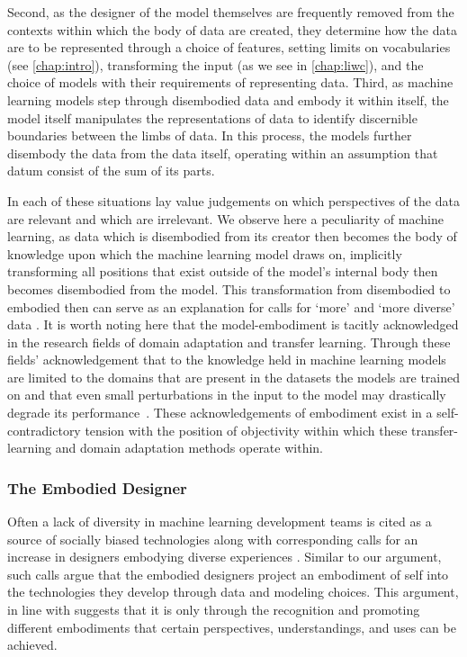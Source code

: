 Second, as the designer of the model themselves are frequently removed from the contexts within which the body of data are created, they determine how the data are to be represented through a choice of features, setting limits on vocabularies (see \autoref{chap:intro}), transforming the input (as we see in \autoref{chap:liwc}), and the choice of models with their requirements of representing data.
Third, as machine learning models step through disembodied data and embody it within itself, the model itself manipulates the representations of data to identify discernible boundaries between the limbs of data. In this process, the models further disembody the data from the data itself, operating within an assumption that datum consist of the sum of its parts.

In each of these situations lay value judgements on which perspectives of the data are relevant and which are irrelevant. We observe here a peculiarity of machine learning, as data which is disembodied from its creator then becomes the body of knowledge upon which the machine learning model draws on, implicitly transforming all positions that exist outside of the model's internal body then becomes disembodied from the model. This transformation from disembodied to embodied then can serve as an explanation for calls for `more' and `more diverse' data \cite{Holstein:2019}.
It is worth noting here that the model-embodiment is tacitly acknowledged in the research fields of domain adaptation \cite{Daume:2007} and transfer learning. Through these fields' acknowledgement that to the knowledge held in machine learning models are limited to the domains that are present in the datasets the models are trained on and that even small perturbations in the input to the model may drastically degrade its performance~\cite{Szegedy:2014,Daume:2007}. These acknowledgements of embodiment exist in a self-contradictory tension with the position of objectivity within which these transfer-learning and domain adaptation methods operate within.

\subsubsection{The Embodied Designer}
Often a lack of diversity in machine learning development teams is cited as a source of socially biased technologies along with corresponding calls for an increase in designers embodying diverse experiences \cite{West:2019}. Similar to our argument, such calls argue that the embodied designers project an embodiment of self into the technologies they develop through data and modeling choices. This argument, in line with \citet{Haraway:1988} suggests that it is only through the recognition and promoting different embodiments that certain perspectives, understandings, and uses can be achieved.

